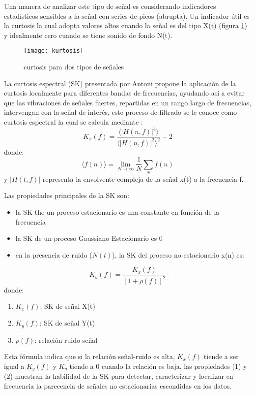         		    Una manera de analizar este tipo de señal es considerando indicadores estadísticos sensibles a la señal con series de picos (abrupta). Un indicador útil es la curtosis la cual adopta valores altos cuando la señal es del tipo X(t) (figura \ref{fig:curtosiss}) y idealmente cero cuando se tiene sonido de fondo N(t).
        		    \begin{figure}
        		        \centering
        		        \texttt{[image: kurtosis]}
        		        \caption{curtosis para dos tipos de señales}
        		        \label{fig:curtosiss}
        		    \end{figure}
        		    La curtosis espectral (SK) presentada por Antoni propone la aplicación de la curtosis localmente para diferentes bandas de frecuencias, ayudando así a evitar que las vibraciones de señales fuertes, repartidas en un rango largo de frecuencias, intervengan con la señal de interés, este proceso de filtrado se le conoce como curtosis espectral la cual se calcula mediante \cite{antoni2006spectral}:
        		     \begin{equation}
        		        K_x(f)= \frac{\langle |H(n,f)|^4 \rangle}{\langle |H(n,f)|^2 \rangle^2}-2
        		    \end{equation}
        		    donde:
        		    \begin{equation}        		        
        		        \langle f(n) \rangle = \lim_{N\to\infty} \frac{1}{N} \sum_{N} f(n)
        		    \end{equation}
        		    y $|H(t,f)|$ representa la envolvente compleja de la señal x(t) a la frecuencia f.
        		    
        		    Las propiedades principales de la SK son:
        		    \begin{itemize}
        		        \item la SK the un proceso estacionario es una constante en función de la frecuencia
        		        \item la SK de un proceso Gaussiano Estacionario es 0
        		        \item en la presencia de ruido ($N(t)$), la SK del proceso no estacionario x(n) es:
        		    \end{itemize}
        		    \begin{equation}
        		        K_y(f)=\frac{K_x(f)}{\left[1+\rho(f)\right]^2}
        		    \end{equation}
        		    donde:
        		    \begin{enumerate}
        		        \item $K_x(f)$: SK de señal X(t)
        		        \item $K_y(f)$: SK de señal Y(t)
        		        \item $\rho(f)$: relación ruido-señal
        		    \end{enumerate}
        		    Esta fórmula indica que si la relación señal-ruido es alta, $K_x(f)$ tiende a ser igual a $K_y(f)$ y $K_y$ tiende a  0 cuando la relación es baja.  
        		    las propiedades (1) y (2) muestran la habilidad de la SK para detectar, caracterizar y localizar en frecuencia la parecencia de señales no estacionarias escondidas en los datos.
    			    
